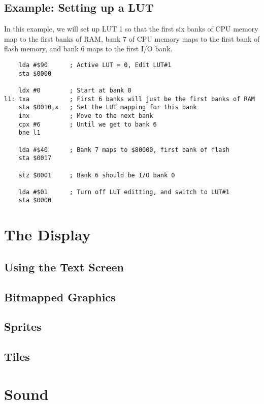 \documentclass[oneside]{book}
\begin{document}
\section{Example: Setting up a LUT}

In this example, we will set up LUT 1 so that the first six banks of CPU memory map to the first banks of RAM, bank 7 of CPU memory maps to the first bank of flash memory, and bank 6 maps to the first I/O bank.

\begin{verbatim}
    lda #$90      ; Active LUT = 0, Edit LUT#1
    sta $0000

    ldx #0        ; Start at bank 0
l1: txa           ; First 6 banks will just be the first banks of RAM
    sta $0010,x   ; Set the LUT mapping for this bank
    inx           ; Move to the next bank
    cpx #6        ; Until we get to bank 6
    bne l1

    lda #$40      ; Bank 7 maps to $80000, first bank of flash
    sta $0017

    stz $0001     ; Bank 6 should be I/O bank 0

    lda #$01      ; Turn off LUT editting, and switch to LUT#1
    sta $0000
\end{verbatim}

\chapter{The Display}

\section{Using the Text Screen}

\section{Bitmapped Graphics}

\section{Sprites}

\section{Tiles}

\chapter{Sound}
\end{document}
